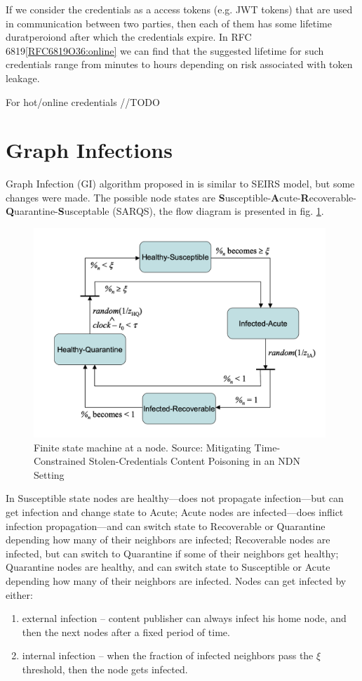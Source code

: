 \documentclass[nostrict]{szablonPG}
\begin{document}
If we consider the credentials as a access tokens (e.g. JWT tokens) that are used in communication between two parties, then each of them has some lifetime duratperoiond after which the credentials expire. In RFC 6819\ref{RFC6819O36:online} we can find that the suggested lifetime for such credentials range from minutes to hours depending on risk associated with token leakage.

For hot/online credentials 
//TODO


\section{Graph Infections}
Graph Infection (GI) algorithm proposed in \cite{konorski2019mitigating} is similar to SEIRS model, but some changes were made. The possible node states are \textbf{S}usceptible-\textbf{A}cute-\textbf{R}ecoverable-\textbf{Q}uarantine-\textbf{S}usceptable (SARQS), the flow diagram is presented in fig. \ref{fig:finite-state-machine-jekon}.
\begin{figure}[h!]
    \includegraphics[width=11cm]{img/finite-state-at-node.png}
    \centering
    \caption{Finite state machine at a node. Source: Mitigating Time-Constrained Stolen-Credentials Content Poisoning in an NDN Setting \cite{konorski2019mitigating}}
    \label{fig:finite-state-machine-jekon}
\end{figure} 
In Susceptible state nodes are healthy––does not propagate infection––but can get infection and change state to Acute; Acute nodes are infected––does inflict infection propagation––and can switch state to Recoverable or Quarantine depending how many of their neighbors are infected; Recoverable nodes are infected, but can switch to Quarantine if some of their neighbors get healthy; Quarantine nodes are healthy, and can switch state to Susceptible or Acute depending how many of their neighbors are infected. 
Nodes can get infected by either:
\begin{enumerate}
    \item external infection -- content publisher can always infect his home node, and then the next nodes after a fixed period of time.
    \item internal infection -- when the fraction of infected neighbors pass the $\xi$ threshold, then the node gets infected. 
\end{enumerate}
\end{document}
